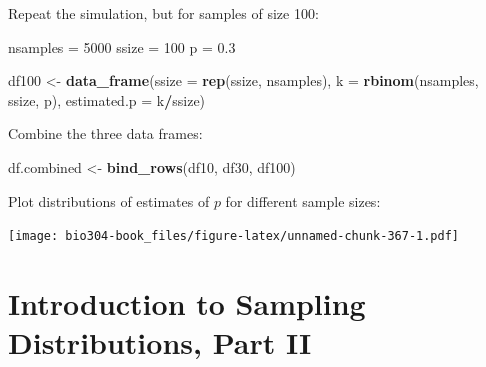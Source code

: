 \documentclass[]{book}
\newenvironment{Shaded}{\begin{snugshade}}{\end{snugshade}}
\newcommand{\DataTypeTok}[1]{\textcolor[rgb]{0.13,0.29,0.53}{#1}}
\newcommand{\DecValTok}[1]{\textcolor[rgb]{0.00,0.00,0.81}{#1}}
\newcommand{\FloatTok}[1]{\textcolor[rgb]{0.00,0.00,0.81}{#1}}
\newcommand{\KeywordTok}[1]{\textcolor[rgb]{0.13,0.29,0.53}{\textbf{#1}}}
\newcommand{\NormalTok}[1]{#1}
\newcommand{\OperatorTok}[1]{\textcolor[rgb]{0.81,0.36,0.00}{\textbf{#1}}}
\newcommand{\StringTok}[1]{\textcolor[rgb]{0.31,0.60,0.02}{#1}}
\theoremstyle{definition}
\theoremstyle{definition}
\theoremstyle{definition}
\theoremstyle{remark}
\begin{document}
Repeat the simulation, but for samples of size 100:

\begin{Shaded}
\begin{Highlighting}[]
\NormalTok{nsamples =}\StringTok{ }\DecValTok{5000}
\NormalTok{ssize =}\StringTok{ }\DecValTok{100}
\NormalTok{p =}\StringTok{ }\FloatTok{0.3}

\NormalTok{df100 <-}\StringTok{ }\KeywordTok{data_frame}\NormalTok{(}\DataTypeTok{ssize =} \KeywordTok{rep}\NormalTok{(ssize, nsamples),}
                   \DataTypeTok{k =} \KeywordTok{rbinom}\NormalTok{(nsamples, ssize, p),}
                   \DataTypeTok{estimated.p =}\NormalTok{ k}\OperatorTok{/}\NormalTok{ssize)}
\end{Highlighting}
\end{Shaded}

Combine the three data frames:

\begin{Shaded}
\begin{Highlighting}[]
\NormalTok{df.combined <-}\StringTok{ }\KeywordTok{bind_rows}\NormalTok{(df10, df30, df100)}
\end{Highlighting}
\end{Shaded}

Plot distributions of estimates of \(p\) for different sample sizes:

\begin{Shaded}
\end{Shaded}

\texttt{[image: bio304-book\_files/figure-latex/unnamed-chunk-367-1.pdf]}

\hypertarget{introduction-to-sampling-distributions-part-ii}{%
\chapter{Introduction to Sampling Distributions, Part
II}\label{introduction-to-sampling-distributions-part-ii}}
\end{document}
